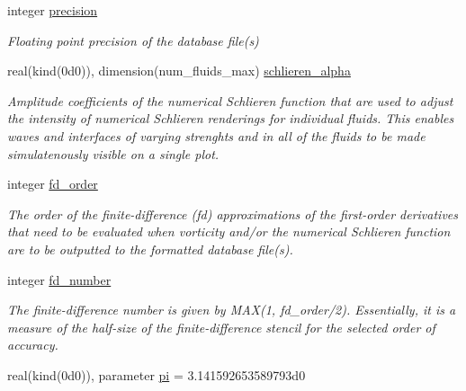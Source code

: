 \begin{DoxyCompactItemize}
\item 
integer \hyperlink{namespacem__global__parameters_a6ed5e5561c16f30a4010f6612877029d}{precision}
\begin{DoxyCompactList}\small\item\em Floating point precision of the database file(s) \end{DoxyCompactList}\item 
real(kind(0d0)), dimension(num\+\_\+fluids\+\_\+max) \hyperlink{namespacem__global__parameters_ada8a4a23b5804dfa9843b25ddd1cd8c1}{schlieren\+\_\+alpha}
\begin{DoxyCompactList}\small\item\em Amplitude coefficients of the numerical Schlieren function that are used to adjust the intensity of numerical Schlieren renderings for individual fluids. This enables waves and interfaces of varying strenghts and in all of the fluids to be made simulatenously visible on a single plot. \end{DoxyCompactList}\item 
integer \hyperlink{namespacem__global__parameters_a8892cc67c7d04be4d8e6d02a86e209bc}{fd\+\_\+order}
\begin{DoxyCompactList}\small\item\em The order of the finite-\/difference (fd) approximations of the first-\/order derivatives that need to be evaluated when vorticity and/or the numerical Schlieren function are to be outputted to the formatted database file(s). \end{DoxyCompactList}\item 
integer \hyperlink{namespacem__global__parameters_a60d7ab72fdab2b005144a5a45aa572de}{fd\+\_\+number}
\begin{DoxyCompactList}\small\item\em The finite-\/difference number is given by M\+AX(1, fd\+\_\+order/2). Essentially, it is a measure of the half-\/size of the finite-\/difference stencil for the selected order of accuracy. \end{DoxyCompactList}\item 
real(kind(0d0)), parameter \hyperlink{namespacem__global__parameters_a21765a90c01d221524670d1344b126cd}{pi} = 3.\+141592653589793d0
\end{DoxyCompactItemize}
